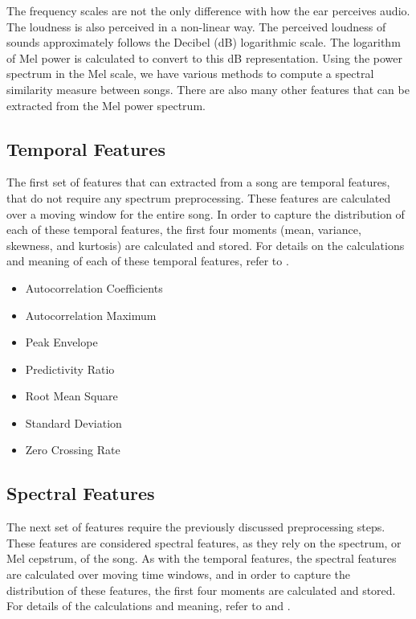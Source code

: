 \documentclass[12pt]{article}
\begin{document}
The frequency scales are not the only difference with how the ear perceives audio.  The loudness is also perceived in a non-linear way.  The perceived loudness of sounds approximately follows the Decibel (dB) logarithmic scale.  The logarithm of Mel power is calculated to convert to this dB representation.  Using the power spectrum in the Mel scale, we have various methods to compute a spectral similarity measure between songs.  There are also many other features that can be extracted from the Mel power spectrum.

\subsection{Temporal Features}
The first set of features that can extracted from a song are temporal features, that do not require any spectrum preprocessing.  These features are calculated over a moving window for the entire song.  In order to capture the distribution of each of these temporal features, the first four moments (mean, variance, skewness, and kurtosis) are calculated and stored.  For details on the calculations and meaning of each of these temporal features, refer to \cite{lerch:aca}.

\begin{itemize}
\item Autocorrelation Coefficients
\item Autocorrelation Maximum
\item Peak Envelope
\item Predictivity Ratio
\item Root Mean Square
\item Standard Deviation
\item Zero Crossing Rate
\end{itemize}

\subsection{Spectral Features}
The next set of features require the previously discussed preprocessing steps.  These features are considered spectral features, as they rely on the spectrum, or Mel cepstrum, of the song.  As with the temporal features, the spectral features are calculated over moving time windows, and in order to capture the distribution of these features, the first four moments are calculated and stored.  For details of the calculations and meaning, refer to \cite{lerch:aca} and \cite{pampalk:dissertation}.
\end{document}
